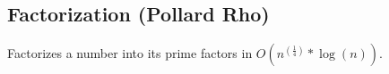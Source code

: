 \subsection{Factorization (Pollard Rho)}

Factorizes a number into its prime factors in $O(n^{(\frac{1}{4})} * \log (n))$.
